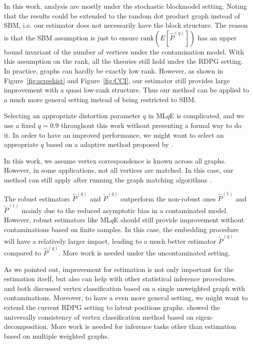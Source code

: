 In this work, analysis are mostly under the stochastic blockmodel setting. Noting that the results could be extended to the random dot product graph instead of SBM, i.e. our estimator does not necessarily have the block structure. The reason is that the SBM assumption is just to ensure $\mathrm{rank}(E[\hat{P}^{(q)}])$ has an upper bound invariant of the number of vertices under the contamination model. With this assumption on the rank, all the theories still hold under the RDPG setting. In practice, graphs can hardly be exactly low rank. However, as shown in Figure~\ref{fig:screehist} and Figure~\ref{fig:CCI}, our estimator still provides large improvement with a quasi low-rank structure. Thus our method can be applied to a much more general setting instead of being restricted to SBM.

Selecting an appropriate distortion parameter $q$ in ML$q$E is complicated, and we use a fixed $q = 0.9$ throughout this work without presenting a formal way to do it. In order to have an improved performance, we might want to select an appropriate $q$ based on a adaptive method proposed by \citet{qin2017robust}.

In this work, we assume vertex correspondence is known across all graphs. However, in some applications, not all vertices are matched. In this case, our method can still apply after running the graph matching algorithms \citep{lyzinski2016graph, lyzinski2015spectral, lyzinski2014seeded}.

The robust estimators $\hat{P}^{(q)}$ and $\widetilde{P}^{(q)}$ outperform the non-robust ones $\hat{P}^{(1)}$ and $\widetilde{P}^{(1)}$ mainly due to the reduced asymptotic bias in a contaminated model. However, robust estimators like ML$q$E should still provide improvement without contaminations based on finite samples. In this case, the embedding procedure will have a relatively larger impact, leading to a much better estimator $\widetilde{P}^{(q)}$ compared to $\hat{P}^{(q)}$. More work is needed under the uncontaminated setting.

As we pointed out, improvement for estimation is not only important for the estimation itself, but also can help with other statistical inference procedures. \citet{priebe2015statistical} and \citet{chen2016robust} both discussed vertex classification based on a single unweighted graph with contaminations.
Moreover, to have a even more general setting, we might want to extend the current RDPG setting to latent positions graphs. \citet{tang2013universally} showed the universally consistency of vertex classification method based on eigen-decomposition.
More work is needed for inference tasks other than estimation based on multiple weighted graphs.

